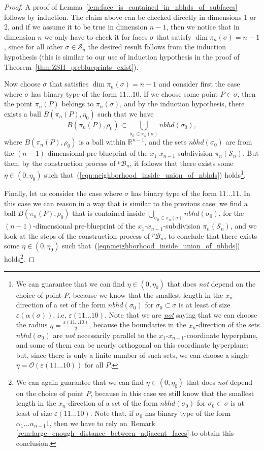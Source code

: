 \documentclass[12pt,letterpaper]{article}
\renewcommand{\S}{\mathcal{S}}
\renewcommand{\O}{\mathcal{O}}
\newcommand{\B}{\mathcal{B}}
\newcommand{\RR}{\mathbb{R}}
\newcommand{\eps}{\varepsilon}
\newcommand{\nbhd}{\mathit{nbhd}}
\renewcommand{\a}{\alpha}
\begin{document}
\begin{proof}
A proof of Lemma~\ref{lem:face_is_contained_in_nbhds_of_subfaces}  follows by induction. The claim above can be checked directly in dimensions 1 or 2, and if we assume it to be true in dimension $n-1$, then we notice that in dimension $n$ we only have to check it for faces $\sigma$ that satisfy $\dim{\pi_n(\sigma)} = n-1$, since for all other $\sigma \in \S_n$ the desired result follows from the induction hypothesis (this is similar to our use of induction hypothesis in the proof of Theorem~\ref{thm:ZSH_preblueprints_exist}).  

Now choose $\sigma$ that satisfies $\dim{\pi_n(\sigma)} = n-1$ and consider first the case where $\sigma$ has binary type of the form $11...10$. If we choose some point $P \in \sigma$, then the point  $\pi_n(P)$ belongs to $\pi_n(\sigma)$, and by the induction hypothesis, there exists a ball $B(\pi_n(P), \eta_0)$ such that we have
$$
B(\pi_n(P), \rho_0) \subset \bigcup_{\sigma_0 \subset \pi_n(\sigma)} \nbhd(\sigma_0),
$$
where $B(\pi_n(P), \rho_0)$ is a ball within $\RR^{n-1}$, and the sets $\nbhd(\sigma_0)$ are from the $(n-1)$-dimensional pre-blueprint of the $x_1$-$x_{n-1}$-subdivision  $\pi_n(\S_n)$.  But then, by the construction process of $^p\!\B_n$, it follows that there exists some $\eta \in (0, \eta_0)$ such that~(\ref{eqn:neighborhood_inside_union_of_nbhds}) holds\footnote{We can guarantee that we can find $\eta \in (0, \eta_0)$ that does {\em not} depend on the choice of point $P$, because we know that the smallest length in the $x_n$-direction of a set of the form $\nbhd(\sigma_0)$ for $\sigma_0 \subset \sigma$ is at least of size $\eps(\a(\sigma))$, i.e, $\eps(11...10)$. Note that we are \ul{\em not} saying that we can choose the radius $\eta = \frac{\eps(11...10)}{2}$, because the boundaries in the $x_n$-direction of the sets $\nbhd(\sigma_0)$ are {\em not} necessarily parallel to the $x_1$-$x_{n-1}$-coordinate hyperplane, and some of them can be nearly orthogonal on this coordinate hyperplane; but, since there is only a finite number of such sets, we can choose a single $\eta = \O(\eps(11...10))$ for all $P$.}. 

Finally, let us consider the case  where $\sigma$ has binary type of the form $11...11$. In this case we can reason in a way that is similar to the previous case: we find a ball $B(\pi_n(P), \rho_0)$ that is contained inside $\bigcup_{\sigma_0 \subset \pi_n(\sigma)} \nbhd(\sigma_0)$, for the $(n-1)$-dimensional pre-blueprint of the $x_1$-$x_{n-1}$-subdivision  $\pi_n(\S_n)$, and we look at the steps of the construction process of $^p\!\B_n$, to conclude that there exists some $\eta \in (0, \eta_0)$ such that~(\ref{eqn:neighborhood_inside_union_of_nbhds}) holds\footnote{We can again guarantee that we can find $\eta \in (0, \eta_0)$ that does {\em not} depend on the choice of point $P$, because in this case we still know that the smallest length in the $x_n$-direction of a set of the form $\nbhd(\sigma_0)$ for $\sigma_0 \subset \sigma$ is at least of size $\eps(11...10)$. Note that, if $\sigma_0$ has binary type of the form $\a_1...\a_{n-1}1$, then we have to rely on~Remark \ref{rem:large_enough_distance_between_adjacent_faces} to obtain this conclusion. }.
%
\end{proof}
\end{document}
